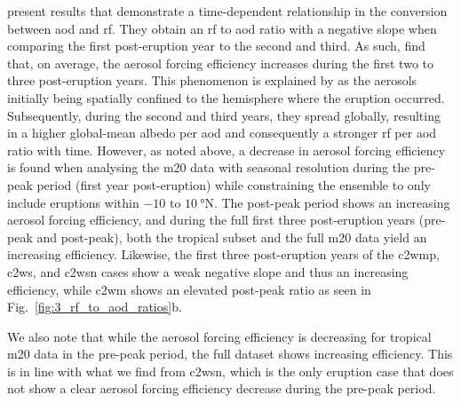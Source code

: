 \documentclass{ametsocV6.1}
\begin{document}
\citet[][their Fig.\ 1c,d]{marshall2020} present results that demonstrate a
time-dependent relationship in the conversion between \gls{aod} and \gls{rf}. They
obtain an \gls{rf} to \gls{aod} ratio with a negative slope when comparing the first
post-eruption year to the second and third. As such, \citet{marshall2020} find that, on
average, the aerosol forcing efficiency increases during the first two to three
post-eruption years. This phenomenon is explained by \citet{marshall2020} as the
aerosols initially being spatially confined to the hemisphere where the eruption
occurred. Subsequently, during the second and third years, they spread globally,
resulting in a higher global-mean albedo per \gls{aod} and consequently a stronger
\gls{rf} per \gls{aod} ratio with time. However, as noted above, a decrease in aerosol
forcing efficiency is found when analysing the \gls{m20} data with seasonal resolution
during the pre-peak period (first year post-eruption) while constraining the ensemble to
only include eruptions within \(-10\) to \(\SI{10}{\degree\mathrm{N}}\). The post-peak
period shows an increasing aerosol forcing efficiency, and during the full first three
post-eruption years (pre-peak and post-peak), both the tropical subset and the full
\gls{m20} data yield an increasing efficiency. Likewise, the first three post-eruption
years of the \gls{c2wmp}, \gls{c2ws}, and \gls{c2wsn} cases show a weak negative slope
and thus an increasing efficiency, while \gls{c2wm} shows an elevated post-peak ratio as
seen in Fig.~\ref{fig:3_rf_to_aod_ratios}b.

We also note that while the aerosol forcing efficiency is decreasing for tropical
\gls{m20} data in the pre-peak period, the full dataset shows increasing efficiency.
This is in line with what we find from \gls{c2wsn}, which is the only eruption case that
does not show a clear aerosol forcing efficiency decrease during the pre-peak period.
\end{document}
